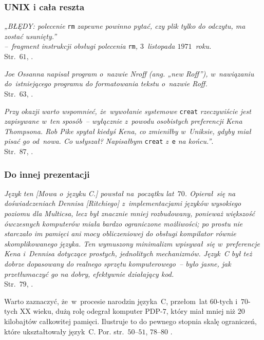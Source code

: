 \documentclass[10pt,t]{beamer}
\begin{document}
\begin{frame}
  \frametitle{UNIX i cała reszta}


  \textit{„BŁĘDY: polecenie} \texttt{rm} \textit{zapewne powinno pytać, czy
    plik tylko do odczytu, ma zostać usunięty.”} \\
  \hspace{5em} \textit{--~fragment instrukcji obsługi polecenia}
  \texttt{rm}\textit{, $3$~listopada $1971$~roku.} \\[0.3em]
  Str.~$61$, \parencite{Kernighan-Jak-Unix-tworzyl-historie-Pub-2021}.

  \textit{Joe Ossanna napisał program o~nazwie Nroff (ang. „new Roff”),
    w~nawiązaniu do~istniejącego programu do formatowania tekstu
    o~nazwie Roff.} \\[0.3em]
  Str.~$63$, \parencite{Kernighan-Jak-Unix-tworzyl-historie-Pub-2021}.

  \textit{Przy okazji warto wspomnieć, że~wywołanie systemowe}
  \texttt{creat} \textit{rzeczywiście jest zapisywane w~ten sposób~--
    wyłącznie z~powodu osobistych preferencji Kena Thompsona. Rob Pike
    spytał kiedyś Kena, co zmieniłby w~Uniksie, gdyby miał pisać go od~nowa.
    Co usłyszał? Napisałbym} \texttt{creat} \textit{z}~\texttt{e}
  \textit{na końcu.”}. \\[0.3em]
  Str.~$87$, \parencite{Kernighan-Jak-Unix-tworzyl-historie-Pub-2021}.

\end{frame}





\begin{frame}
  \frametitle{Do innej prezentacji}


  \textit{Język ten [Mowa o~języku C.] powstał na~początku lat~$70$.
    Opierał~się na doświadczeniach Dennisa [Ritchiego] z~implementacjami
    języków wysokiego poziomu dla Multicsa, lecz był znacznie mniej
    rozbudowany, ponieważ większość ówczesnych komputerów miała
    bardzo ograniczone możliwości; po prostu nie starczało im pamięci
    ani mocy obliczeniowej do obsługi kompilator równie skomplikowanego
    języka. Ten wymuszony minimalizm wpisywał~się w~preferencje
    Kena i~Dennisa dotyczące prostych, jednolitych mechanizmów. Język~C
    był też dobrze dopasowany do realnego sprzętu komputerowego~--
    było jasne, jak przetłumaczyć go na dobry, efektywnie działający
    kod.} \\[0.3em]
  Str.~$79$, \parencite{Kernighan-Jak-Unix-tworzyl-historie-Pub-2021}.

  Warto zaznaczyć, że~w~procesie narodzin języka~C, przełom~lat $60$-tych
  i~$70$-tych XX wieku, dużą rolę odegrał komputer PDP-$7$, który miał
  mniej niż $20$ kilobajtów całkowitej pamięci. Ilustruje to do pewnego
  stopnia skalę ograniczeń, które ukształtowały język~C.
  Por. str.~$50$--$51$, $78$--$80$
  \parencite{Kernighan-Jak-Unix-tworzyl-historie-Pub-2021}.

\end{frame}
\end{document}
